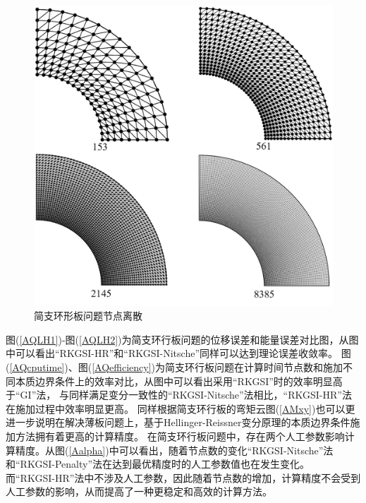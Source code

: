 \begin{figure}[H]
    \centering
    \includegraphics[scale=0.4]{figure/PHR/A/annularmsh.png}
    \caption{简支环形板问题节点离散}\label{annularmsh}
\end{figure}
图(\ref{AQLH1})-图(\ref{AQLH2})为简支环行板问题的位移误差和能量误差对比图，从图中可以看出“RKGSI-HR”和“RKGSI-Nitsche”同样可以达到理论误差收敛率。
图(\ref{AQcputime})、图(\ref{AQefficiency})为简支环行板问题在计算时间节点数和施加不同本质边界条件上的效率对比，从图中可以看出采用“RKGSI”时的效率明显高于“GI”法，
与同样满足变分一致性的“RKGSI-Nitsche”法相比，“RKGSI-HR”法在施加过程中效率明显更高。
同样根据简支环行板的弯矩云图(\ref{AMxy})也可以更进一步说明在解决薄板问题上，基于Hellinger-Reissner变分原理的本质边界条件施加方法拥有着更高的计算精度。
在简支环行板问题中，存在两个人工参数影响计算精度。从图(\ref{Aalpha})中可以看出，随着节点数的变化“RKGSI-Nitsche”法和“RKGSI-Penalty”法在达到最优精度时的人工参数值也在发生变化。
而“RKGSI-HR”法中不涉及人工参数，因此随着节点数的增加，计算精度不会受到人工参数的影响，从而提高了一种更稳定和高效的计算方法。

